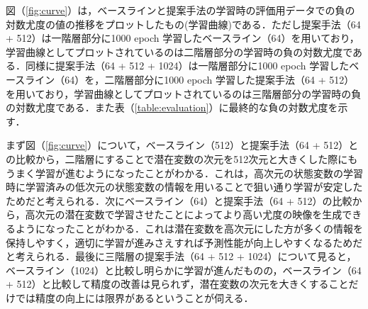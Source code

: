 \documentclass[10pt, twocolumn]{jarticle}
\begin{document}
図（\ref{fig:curve}）は，ベースラインと提案手法の学習時の評価用データでの負の対数尤度の値の推移をプロットしたもの(学習曲線)である．ただし提案手法（64 + 512）は一階層部分に1000 epoch 学習したベースライン（64）を用いており，学習曲線としてプロットされているのは二階層部分の学習時の負の対数尤度である．同様に提案手法（64 + 512 + 1024）は一階層部分に1000 epoch 学習したベースライン（64）を，二階層部分に1000 epoch 学習した提案手法（64 + 512）を用いており，学習曲線としてプロットされているのは三階層部分の学習時の負の対数尤度である．また表（\ref{table:evaluation}）に最終的な負の対数尤度を示す．

まず図（\ref{fig:curve}）について，ベースライン（512）と提案手法（64 + 512）との比較から，二階層にすることで潜在変数の次元を512次元と大きくした際にもうまく学習が進むようになったことがわかる．これは，高次元の状態変数の学習時に学習済みの低次元の状態変数の情報を用いることで狙い通り学習が安定したためだと考えられる．次にベースライン（64）と提案手法（64 + 512）の比較から，高次元の潜在変数で学習させたことによってより高い尤度の映像を生成できるようになったことがわかる．これは潜在変数を高次元にした方が多くの情報を保持しやすく，適切に学習が進みさえすれば予測性能が向上しやすくなるためだと考えられる．最後に三階層の提案手法（64 + 512 + 1024）について見ると，ベースライン（1024）と比較し明らかに学習が進んだものの，ベースライン（64 + 512）と比較して精度の改善は見られず，潜在変数の次元を大きくすることだけでは精度の向上には限界があるということが伺える．
\end{document}

